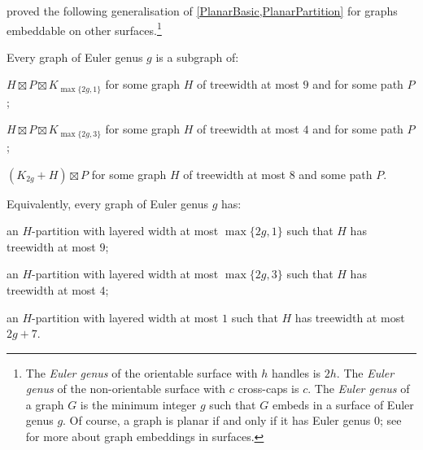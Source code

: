 \documentclass{patmorin}
\begin{document}



\citet{dujmovic.joret.ea:planar} proved the following generalisation of \cref{PlanarBasic,PlanarPartition} for graphs embeddable on other surfaces.\footnote{The \textit{Euler genus} of the orientable surface with $h$ handles is $2h$. The \textit{Euler genus} of the non-orientable surface with $c$ cross-caps is $c$. The \textit{Euler genus} of a graph $G$ is the minimum integer $g$ such that $G$ embeds in a surface of Euler genus $g$. Of course, a graph is planar if and only if it has Euler genus 0; see \citep{mohar.thomassen:graphs} for more about graph embeddings in surfaces.}

\begin{thm}
\label{SurfacePartition}
Every graph of Euler genus $g$ is a subgraph of:
\begin{compactenum}[(a)]
\item  $H \boxtimes P \boxtimes K_{\max\{2g,1\}}$ for some graph $H$ of treewidth at most $9$ and for some path $P$;
\item  $H \boxtimes P \boxtimes K_{\max\{2g,3\}}$ for some graph $H$ of treewidth at most $4$ and for some path $P$;
\item $(K_{2g} + H )  \boxtimes P$ for some graph $H$ of treewidth at most $8$  and some path $P$. 
\end{compactenum}
Equivalently, every graph of Euler genus $g$ has:
\begin{compactenum}[(a)]
\item an $H$-partition with layered width at most $\max\{2g,1\}$ such that $H$ has treewidth at most $9$;
\item an $H$-partition with layered width at most $\max\{2g,3\}$ such that $H$ has treewidth at most $4$; 
\item an $H$-partition with layered width at most $1$ such that $H$ has treewidth at most $2g+7$. 
\end{compactenum}
\end{thm}
\end{document}
